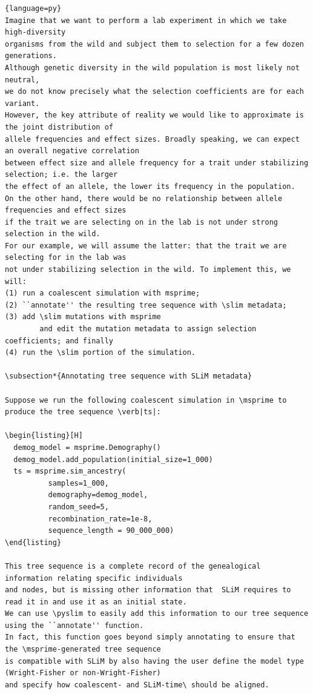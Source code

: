 \documentclass[12pt]{article}
\newcommand{\msprime}[0]{\texttt{msprime}\xspace}
\newcommand{\slim}[0]{\texttt{SLiM}\xspace}
\newcommand{\pyslim}[0]{\texttt{pyslim}\xspace}
\begin{document}
\begin{lstlisting}{language=py}
Imagine that we want to perform a lab experiment in which we take high-diversity
organisms from the wild and subject them to selection for a few dozen generations.
Although genetic diversity in the wild population is most likely not neutral,
we do not know precisely what the selection coefficients are for each variant.
However, the key attribute of reality we would like to approximate is the joint distribution of
allele frequencies and effect sizes. Broadly speaking, we can expect an overall negative correlation
between effect size and allele frequency for a trait under stabilizing selection; i.e. the larger
the effect of an allele, the lower its frequency in the population.
On the other hand, there would be no relationship between allele frequencies and effect sizes
if the trait we are selecting on in the lab is not under strong selection in the wild.
For our example, we will assume the latter: that the trait we are selecting for in the lab was
not under stabilizing selection in the wild. To implement this, we will:
(1) run a coalescent simulation with msprime;
(2) ``annotate'' the resulting tree sequence with \slim metadata;
(3) add \slim mutations with msprime
        and edit the mutation metadata to assign selection coefficients; and finally
(4) run the \slim portion of the simulation.

\subsection*{Annotating tree sequence with SLiM metadata}

Suppose we run the following coalescent simulation in \msprime to produce the tree sequence \verb|ts|:

\begin{listing}[H]
  demog_model = msprime.Demography()
  demog_model.add_population(initial_size=1_000)
  ts = msprime.sim_ancestry(
          samples=1_000,
          demography=demog_model,
          random_seed=5,
          recombination_rate=1e-8,
          sequence_length = 90_000_000)
\end{listing}

This tree sequence is a complete record of the genealogical information relating specific individuals
and nodes, but is missing other information that  SLiM requires to read it in and use it as an initial state.
We can use \pyslim to easily add this information to our tree sequence using the ``annotate'' function.
In fact, this function goes beyond simply annotating to ensure that the \msprime-generated tree sequence
is compatible with SLiM by also having the user define the model type (Wright-Fisher or non-Wright-Fisher)
and specify how coalescent- and SLiM-time\ should be aligned.


\end{lstlisting}
\end{document}
